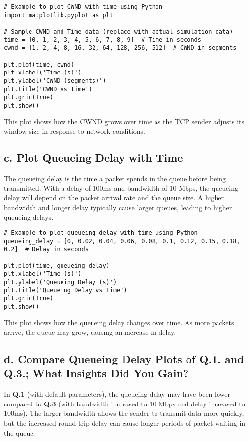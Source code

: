 \documentclass{article}
\begin{document}
\begin{verbatim}
# Example to plot CWND with time using Python
import matplotlib.pyplot as plt

# Sample CWND and Time data (replace with actual simulation data)
time = [0, 1, 2, 3, 4, 5, 6, 7, 8, 9]  # Time in seconds
cwnd = [1, 2, 4, 8, 16, 32, 64, 128, 256, 512]  # CWND in segments

plt.plot(time, cwnd)
plt.xlabel('Time (s)')
plt.ylabel('CWND (segments)')
plt.title('CWND vs Time')
plt.grid(True)
plt.show()
\end{verbatim}

This plot shows how the CWND grows over time as the TCP sender adjusts its window size in response to network conditions.

\subsection*{c. Plot Queueing Delay with Time}

The queueing delay is the time a packet spends in the queue before being transmitted. With a delay of 100ms and bandwidth of 10 Mbps, the queueing delay will depend on the packet arrival rate and the queue size. A higher bandwidth and longer delay typically cause larger queues, leading to higher queueing delays.

\begin{verbatim}
# Example to plot queueing delay with time using Python
queueing_delay = [0, 0.02, 0.04, 0.06, 0.08, 0.1, 0.12, 0.15, 0.18, 0.2]  # Delay in seconds

plt.plot(time, queueing_delay)
plt.xlabel('Time (s)')
plt.ylabel('Queueing Delay (s)')
plt.title('Queueing Delay vs Time')
plt.grid(True)
plt.show()
\end{verbatim}

This plot shows how the queueing delay changes over time. As more packets arrive, the queue may grow, causing an increase in delay.

\subsection*{d. Compare Queueing Delay Plots of Q.1. and Q.3.; What Insights Did You Gain?}

In \textbf{Q.1} (with default parameters), the queueing delay may have been lower compared to \textbf{Q.3} (with bandwidth increased to 10 Mbps and delay increased to 100ms). The larger bandwidth allows the sender to transmit data more quickly, but the increased round-trip delay can cause longer periods of packet waiting in the queue.
\end{document}
